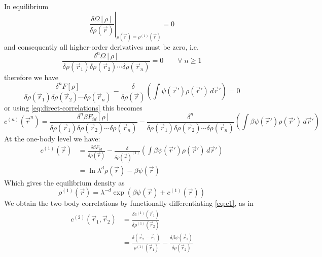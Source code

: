 \documentclass[12pt]{report}
\begin{document}
In equilibrium
\begin{equation}
  \left.
  \frac{\delta \Omega[\rho]}{\delta\rho(\vec{r})}
  \right|_{\rho(\vec{r}) = \rho^{(1)}(\vec{r})}
  = 0
\end{equation}
and consequently all higher-order derivatives must be zero, i.e.\
\begin{equation}
  \frac{\delta^n \Omega[\rho]}{\delta\rho(\vec{r}_1) \delta\rho(\vec{r}_2) \cdots \delta\rho(\vec{r}_n)} = 0 \qquad \forall \; n \ge 1
\end{equation}
therefore we have
\begin{equation}
  \frac{\delta^n F[\rho]}{\delta \rho(\vec{r}_1) \delta \rho(\vec{r}_2) \cdots \delta \rho(\vec{r}_n)} -
  \frac{\delta}{\delta\rho(\vec{r})}
  \left(
  \int \psi(\vec{r}') \rho(\vec{r}') \, d\vec{r}'
  \right)
  = 0
\end{equation}
or using \eqref{eq:direct-correlations} this becomes
\begin{equation*}
  c^{(n)}(\vec{r}^n) =
  \frac{\delta^n \beta F_{id}[\rho]}{\delta \rho(\vec{r}_1) \delta \rho(\vec{r}_2) \cdots \delta \rho(\vec{r}_n)} -
  \frac{\delta^n}{\delta \rho(\vec{r}_1) \delta \rho(\vec{r}_2) \cdots \delta \rho(\vec{r}_n)}
  \left(
  \int \beta\psi(\vec{r}') \rho(\vec{r}') \, d\vec{r}'
  \right)
\end{equation*}
At the one-body level we have:
\begin{equation}\label{eq:c1}
  \begin{aligned}
    c^{(1)}(\vec{r}) &=
    \frac{\delta \beta F_{id}}{\delta \rho(\vec{r})} -
    \frac{\delta}{\delta \rho(\vec{r})^{(1)}}
    \left(
    \int \beta\psi(\vec{r}') \rho(\vec{r}') \, d\vec{r}'
    \right) \\
    &=
    \ln{\lambda^d \rho(\vec{r})} -
    \beta\psi(\vec{r})
  \end{aligned}
\end{equation}
Which gives the equilibrium density as
\begin{equation}
  \rho^{(1)}(\vec{r}) = \lambda^{-d} \exp{\left(\beta\psi(\vec{r}) + c^{(1)}(\vec{r})\right)}
\end{equation}
We obtain the two-body correlations by functionally differentiating \eqref{eq:c1}, as in
\begin{equation}\label{eq:c2}
  \begin{aligned}
    c^{(2)}(\vec{r}_1, \vec{r}_2) &=
    \frac{\delta c^{(1)}(\vec{r}_1)}{\delta \rho^{(1)}(\vec{r}_2)} \\
    &=
    \frac{\delta(\vec{r}_2 - \vec{r}_1)}{\rho^{(1)}(\vec{r}_1)} -
    \frac{\delta\beta\psi(\vec{r}_1)}{\delta \rho(\vec{r}_2)}
  \end{aligned}
\end{equation}
\end{document}
